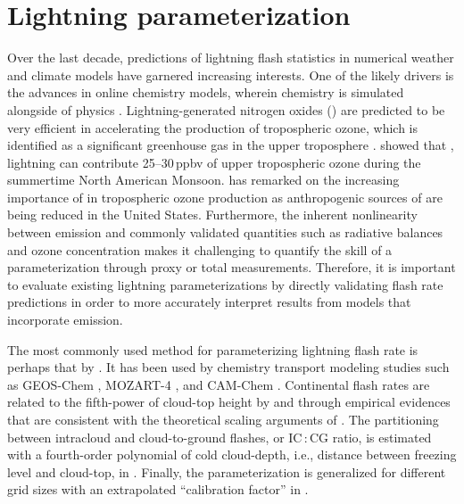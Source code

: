 \chapter{Lightning parameterization} \label{ch:lightning}

\ifpdf
    \graphicspath{{Chapter_lightning/figures/PNG/}{Chapter_lightning/figures/PDF/}{Chapter_lightning/figures/}}
\else
    \graphicspath{{Chapter_lightning/figures/EPS/}{Chapter_lightning/figures/}}
\fi

Over the last decade, predictions of lightning flash statistics in numerical
weather and climate models have garnered increasing interests. One of the
likely drivers is the advances in online chemistry models, wherein chemistry
is simulated alongside of physics \citep[e.g.,][]{Grell:2005fv}.
Lightning-generated nitrogen oxides (\lnox) are predicted to be very
efficient in accelerating the production of tropospheric ozone, which is
identified as a significant greenhouse gas in the upper troposphere
\citep{Lacis:1990fk,Kiehl:1999uq}. \citet{Cooper:2007cr} showed that
, lightning can contribute 25--30\,ppbv of upper tropospheric ozone during
the summertime North American Monsoon. \citet{Choi:2009bh} has remarked on the increasing
importance of  in tropospheric ozone production as anthropogenic
sources of  are being reduced in the United States. Furthermore,
the inherent nonlinearity between  emission and commonly validated
quantities such as radiative balances and ozone concentration makes it
challenging to quantify the skill of a {\lnox} parameterization through
proxy or total  measurements. Therefore, it is important to
evaluate existing lightning parameterizations by directly validating flash
rate predictions in order to more accurately interpret results from models
that incorporate {\lnox} emission.

The most commonly used method for parameterizing lightning flash rate is
perhaps that by \citet{Price:1992wb,Price:1993fk,Price:1994fk}. It has been
used by chemistry transport modeling studies such as GEOS-Chem
\citep{Hudman:2007fu}, MOZART-4 \citep{Emmons:2010fk}, and CAM-Chem
\citep{Lamarque:2012fk}. Continental flash rates are related to the
fifth-power of cloud-top height by \citet{Williams:1985fk} and
\citet[][hereafter PR92]{Price:1992wb} through empirical evidences that are
consistent with the theoretical scaling arguments of \citet{Vonnegut:1963aa}.
The partitioning between intracloud and cloud-to-ground flashes, or IC\,:\,CG
ratio, is estimated with a fourth-order polynomial of cold cloud-depth, i.e.,
distance between freezing level and cloud-top, in \citet[][hereafter
PR93]{Price:1993fk}. Finally, the parameterization is generalized for
different grid sizes with an extrapolated ``calibration factor'' in
\citet[][hereafter PR94]{Price:1994fk}.

